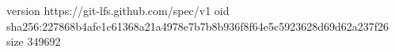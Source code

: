 version https://git-lfs.github.com/spec/v1
oid sha256:227868b4afe1c61368a21a4978e7b7b8b936f8f64e5c5923628d69d62a237f26
size 349692
